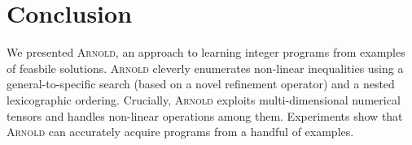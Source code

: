 \documentclass{article}
\newcommand{\learner}{\textsc{Arnold}\xspace}
\renewcommand\[{\begin{equation}}
\renewcommand\]{\end{equation}}
\begin{document}
\section{Conclusion}

We presented \learner, an approach to learning integer programs from examples
of feasbile solutions.
%
\learner cleverly enumerates non-linear inequalities using a
general-to-specific search (based on a novel refinement operator) and a nested
lexicographic ordering.  Crucially, \learner exploits multi-dimensional
numerical tensors and handles non-linear operations among them.
%
Experiments show that \learner can accurately acquire programs from a handful
of examples.






\end{document}
